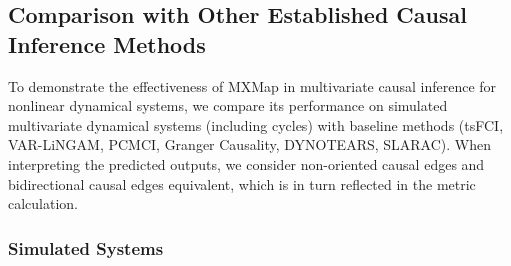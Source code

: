 \subsection{Comparison with Other Established Causal Inference Methods}

To demonstrate the effectiveness of MXMap in multivariate causal inference for nonlinear dynamical systems, we compare its performance on simulated multivariate dynamical systems (including cycles) with baseline methods (tsFCI, VAR-LiNGAM, PCMCI, Granger Causality, DYNOTEARS, SLARAC). When interpreting the predicted outputs, we consider non-oriented causal edges and bidirectional causal edges equivalent, which is in turn reflected in the metric calculation. 


\subsubsection{Simulated Systems}
\label{sec:baseline_sim}

